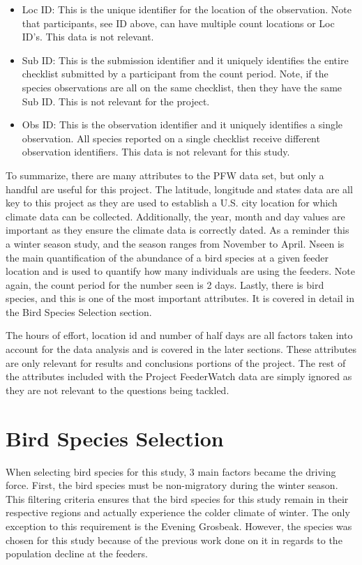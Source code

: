 \begin{itemize}
  \item Loc ID: This is the unique identifier for the location of the observation. Note that participants, see ID above, can have multiple count locations or Loc ID's. This data is not relevant. 
  
  \item Sub ID: This is the submission identifier and it uniquely identifies the entire checklist submitted by a participant from the count period. Note, if the species observations are all on the same checklist, then they have the same Sub ID. This is not relevant for the project.
  
  \item Obs ID: This is the observation identifier and it uniquely identifies a single observation. All species reported on a single checklist receive different observation identifiers. This data is not relevant for this study.

\end{itemize}

To summarize, there are many attributes to the PFW data set, but only a handful are useful for this project. The latitude, longitude and states data are all key to this project as they are used to establish a U.S. city location for which climate data can be collected. Additionally, the year, month and day values are important as they ensure the climate data is correctly dated. As a reminder this a winter season study, and the season ranges from November to April. Nseen is the main quantification of the abundance of a bird species at a given feeder location and is used to quantify how many individuals are using the feeders. Note again, the count period for the number seen is 2 days. Lastly, there is bird species, and this is one of the most important attributes. It is covered in detail in the Bird Species Selection section.

The hours of effort, location id and number of half days are all factors taken into account for the data analysis and is covered in the later sections. These attributes are only relevant for results and conclusions portions of the project. The rest of the attributes included with the Project FeederWatch data are simply ignored as they are not relevant to the questions being tackled.  

\section{Bird Species Selection}

When selecting bird species for this study, 3 main factors became the driving force. First, the bird species must be non-migratory during the winter season. This filtering criteria ensures that the bird species for this study remain in their respective regions and actually experience the colder climate of winter. The only exception to this requirement is the Evening Grosbeak. However, the species was chosen for this study because of the previous work done on it in regards to the population decline at the feeders. 

